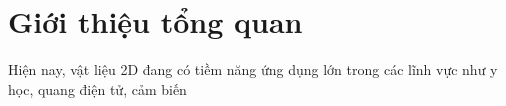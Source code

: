 \documentclass[a4paper]{elsarticle}
\begin{document}
\onehalfspacing
\fontsize{13}{15.6}\selectfont
\section{Giới thiệu tổng quan} 
Hiện nay, vật liệu 2D đang có tiềm năng ứng dụng lớn trong các lĩnh vực như y học, quang điện tử, cảm biến  

\end{document}
